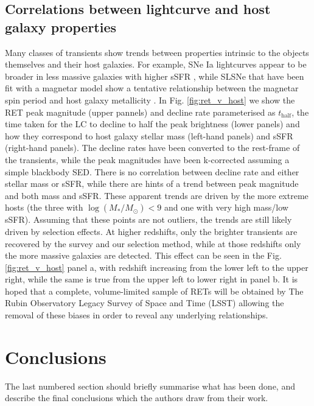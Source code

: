 \documentclass[fleqn,usenatbib,]{mnras}
\begin{document}
\subsection{Correlations between lightcurve and host galaxy properties}
Many classes of transients show trends between properties intrinsic to the objects themselves and their host galaxies. For example, SNe Ia lightcurves appear to be broader in less massive galaxies with higher sSFR \citep{Sullivan2006,Neill2009,Howell2009,Sullivan2010,Roman2018,Kelsey2020}, while SLSNe that have been fit with a magnetar model show a tentative relationship between the magnetar spin period and host galaxy metallicity \citep{Chen2016a}. In Fig. \ref{fig:ret_v_host} we show the RET peak magnitude (upper pannels) and decline rate parameterised as $t_{\mathrm{half}}$, the time taken for the LC to decline to half the peak brightness (lower panels) and how they correspond to host galaxy stellar mass (left-hand panels) and sSFR (right-hand panels). The decline rates have been converted to the rest-frame of the transients, while the peak magnitudes have been k-corrected assuming a simple blackbody SED. There is no correlation between decline rate and either stellar mass or sSFR, while there are hints of a trend between peak magnitude and both mass and sSFR. These apparent trends are driven by the more extreme hosts (the three with $\log\left(M_*/M_{\odot}\right) < 9$ and one with very high mass/low sSFR). Assuming that these points are not outliers, the trends are still likely driven by selection effects. At higher redshifts, only the brighter transients are recovered by the survey and our selection method, while at those redshifts only the more massive galaxies are detected. This effect can be seen in the Fig. \ref{fig:ret_v_host} panel a, with redshift increasing from the lower left to the upper right, while the same is true from the upper left to lower right in panel b. It is hoped that a complete, volume-limited sample of RETs will be obtained by The Rubin Observatory Legacy Survey of Space and Time (LSST) allowing the removal of these biases in order to reveal any underlying relationships.

\section{Conclusions}

The last numbered section should briefly summarise what has been done, and describe
the final conclusions which the authors draw from their work.
\end{document}
